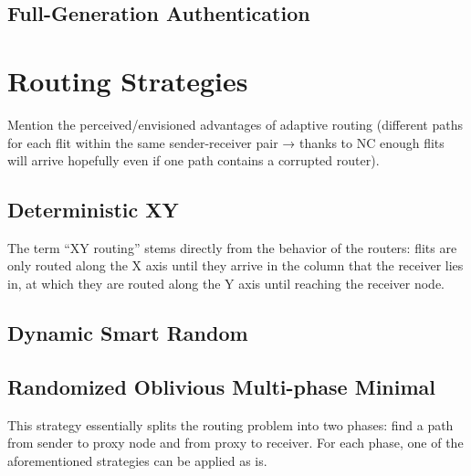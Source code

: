 \subsection{Full-Generation Authentication}

\section{Routing Strategies}
Mention the perceived/envisioned advantages of adaptive routing (different paths for each flit within the same sender-receiver pair → thanks
to NC enough flits will arrive hopefully even if one path contains a corrupted router).

\subsection{Deterministic XY}
The term \enquote{XY routing} stems directly from the behavior of the routers: flits are only routed along the X axis until they arrive in the column
that the receiver lies in, at which they are routed along the Y axis until reaching the receiver node.
\subsection{Dynamic Smart Random}
\subsection{Randomized Oblivious Multi-phase Minimal}
This strategy essentially splits the routing problem into two phases: find a path from sender to proxy node and from proxy to receiver. For each
phase, one of the aforementioned strategies can be applied as is.

